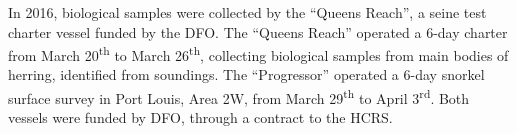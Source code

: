 In 2016, biological samples were collected by the ``Queens Reach'', a seine test charter vessel funded by the DFO. 
The ``Queens Reach'' operated a 6-day charter from March 20\textsuperscript{th} to March 26\textsuperscript{th}, collecting biological samples from main bodies of herring, identified from soundings. 
The ``Progressor'' operated a 6-day snorkel surface survey in Port Louis, Area 2W, from March 29\textsuperscript{th} to April 3\textsuperscript{rd}. 
Both vessels were funded by DFO, through a contract to the HCRS.